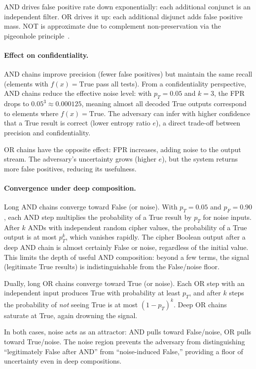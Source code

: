 \documentclass[conference]{IEEEtran}
\theoremstyle{definition}
\theoremstyle{plain}
\theoremstyle{remark}
\begin{document}
AND drives false positive rate down exponentially: each additional
conjunct is an independent filter.  OR drives it up: each additional
disjunct adds false positive mass.  NOT is approximate due to
complement non-preservation via the pigeonhole
principle~\cite{towell2026cipher}.

\paragraph{Effect on confidentiality.}
AND chains improve precision (fewer false positives) but maintain the
same recall (elements with $f(x) = \mathrm{True}$ pass all tests).
From a confidentiality perspective, AND chains reduce the effective noise
level: with $p_T = 0.05$ and $k = 3$, the FPR drops to
$0.05^3 \approx 0.000125$, meaning almost all decoded True outputs
correspond to elements where $f(x) = \mathrm{True}$.
The adversary can infer with higher confidence that a True result is
correct (lower entropy ratio $e$), a direct trade-off between precision
and confidentiality.

OR chains have the opposite effect: FPR increases, adding noise to the
output stream.
The adversary's uncertainty grows (higher $e$), but the system returns
more false positives, reducing its usefulness.

\paragraph{Convergence under deep composition.}
Long AND chains converge toward False (or noise).
With $p_T = 0.05$ and $p_F = 0.90$, each AND step multiplies the
probability of a True result by $p_T$ for noise inputs.
After $k$ ANDs with independent random cipher values, the probability
of a True output is at most $p_T^k$, which vanishes rapidly.
The cipher Boolean output after a deep AND chain is almost certainly
False or noise, regardless of the initial value.
This limits the depth of useful AND composition: beyond a few
terms, the signal (legitimate True results) is indistinguishable from
the False/noise floor.

Dually, long OR chains converge toward True (or noise).
Each OR step with an independent input produces True with probability
at least $p_T$, and after $k$ steps the probability of \emph{not} seeing
True is at most $(1 - p_T)^k$.
Deep OR chains saturate at True, again drowning the signal.

In both cases, noise acts as an attractor: AND pulls toward False/noise,
OR pulls toward True/noise.
The noise region prevents the adversary from distinguishing
``legitimately False after AND'' from ``noise-induced False,'' providing
a floor of uncertainty even in deep compositions.
\end{document}
